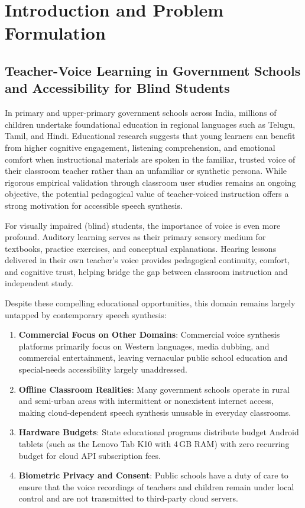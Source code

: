 \chapter{Introduction and Problem Formulation}
\label{Chapter1}

\section{Teacher-Voice Learning in Government Schools and Accessibility for Blind Students}
In primary and upper-primary government schools across India, millions of children undertake foundational education in regional languages such as Telugu, Tamil, and Hindi. Educational research suggests that young learners can benefit from higher cognitive engagement, listening comprehension, and emotional comfort when instructional materials are spoken in the familiar, trusted voice of their classroom teacher rather than an unfamiliar or synthetic persona. While rigorous empirical validation through classroom user studies remains an ongoing objective, the potential pedagogical value of teacher-voiced instruction offers a strong motivation for accessible speech synthesis.

For visually impaired (blind) students, the importance of voice is even more profound. Auditory learning serves as their primary sensory medium for textbooks, practice exercises, and conceptual explanations. Hearing lessons delivered in their own teacher's voice provides pedagogical continuity, comfort, and cognitive trust, helping bridge the gap between classroom instruction and independent study. 

Despite these compelling educational opportunities, this domain remains largely untapped by contemporary speech synthesis:
\begin{enumerate}
    \item \textbf{Commercial Focus on Other Domains}: Commercial voice synthesis platforms primarily focus on Western languages, media dubbing, and commercial entertainment, leaving vernacular public school education and special-needs accessibility largely unaddressed.
    \item \textbf{Offline Classroom Realities}: Many government schools operate in rural and semi-urban areas with intermittent or nonexistent internet access, making cloud-dependent speech synthesis unusable in everyday classrooms.
    \item \textbf{Hardware Budgets}: State educational programs distribute budget Android tablets (such as the Lenovo Tab K10 with 4\,GB RAM) with zero recurring budget for cloud API subscription fees.
    \item \textbf{Biometric Privacy and Consent}: Public schools have a duty of care to ensure that the voice recordings of teachers and children remain under local control and are not transmitted to third-party cloud servers.
\end{enumerate}

